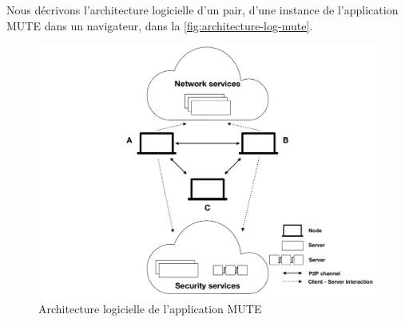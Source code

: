 Nous décrivons l'architecture logicielle d'un pair, \ie d'une instance de l'application \ac{MUTE} dans un navigateur, dans la \autoref{fig:architecture-log-mute}.

\begin{figure}[!ht]
  \centering
  \includegraphics[page=2, trim=0cm 0cm 0cm 0cm, clip, width=.7\linewidth]{img/mute-figures.pdf}
  \caption{Architecture logicielle de l'application MUTE}
  \label{fig:architecture-log-mute}
\end{figure}

